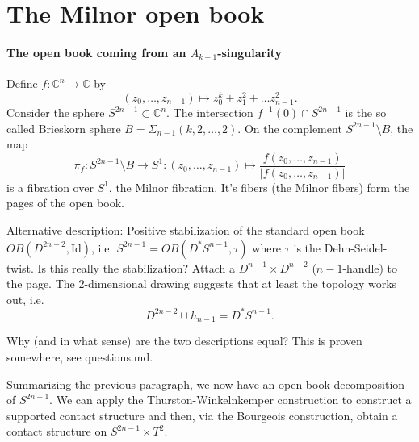 \section*{The Milnor open book}

\paragraph*{The open book coming from an $A_{k-1}$-singularity}
Define $f\colon \mathbb C^n \to \mathbb C$ by
\[
    (z_0, \dots, z_{n-1}) \mapsto z_0^k + z_1^2 + \dots z_{n-1}^2.  
\]
Consider the sphere $S^{2n-1} \subset \mathbb C^n$.
The intersection $f^{-1}(0) \cap S^{2n-1}$ is the so called Brieskorn sphere $B = \Sigma_{n-1}(k,2,\dots,2)$.
On the complement $S^{2n-1} \setminus B$, the map
\[
    \pi_f\colon S^{2n-1}\setminus B \to S^1\colon (z_0, \dots, z_{n-1}) \mapsto \frac{f(z_0, \dots, z_{n-1})}{|f(z_0, \dots, z_{n-1})|}
\]
is a fibration over $S^1$, the Milnor fibration.
It's fibers (the Milnor fibers) form the pages of the open book.

Alternative description: Positive stabilization of the standard open book $OB(D^{2n-2}, \mathrm{Id})$,
i.e. $S^{2n-1} = OB(D^*S^{n-1}, \tau)$ where $\tau$ is the Dehn-Seidel-twist.
Is this really the stabilization?
Attach a $D^{n-1} \times D^{n-2}$ ($n-1$-handle) to the page.
The $2$-dimensional drawing suggests that at least the topology works out, i.e.
\[
    D^{2n-2} \cup h_{n-1} = D^*S^{n-1}.
\]

Why (and in what sense) are the two descriptions equal? This is proven somewhere, see questions.md.

Summarizing the previous paragraph, we now have an open book decomposition of $S^{2n-1}$.
We can apply the Thurston-Winkelnkemper construction to construct a supported contact structure
and then, via the Bourgeois construction, obtain a contact structure on $S^{2n-1} \times T^2$.